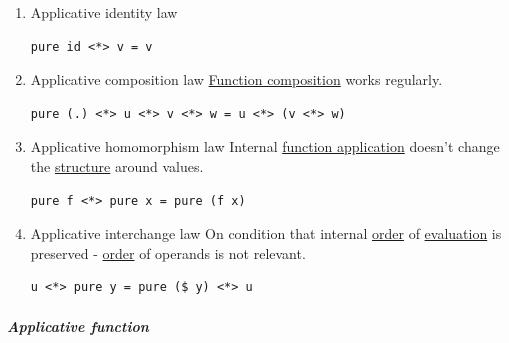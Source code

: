 \documentclass[11pt]{article}
\begin{document}
\begin{enumerate}
\item \label{orgd335983}Applicative identity law
\label{sec:org5c5e2c7}
\begin{verbatim}
pure id <*> v = v
\end{verbatim}

\item \label{org9bb970b}Applicative composition law
\label{sec:orgba0036c}
\hyperref[org3802537]{Function composition} works regularly.\\
\begin{verbatim}
pure (.) <*> u <*> v <*> w = u <*> (v <*> w)
\end{verbatim}

\item \label{orga28c287}Applicative homomorphism law
\label{sec:org22c34c3}
Internal \hyperref[org6aac242]{function application} doesn't change the \hyperref[org8051f61]{structure} around values.\\
\begin{verbatim}
pure f <*> pure x = pure (f x)
\end{verbatim}

\item \label{org15e7bbe}Applicative interchange law
\label{sec:org91d86cf}
On condition that internal \hyperref[orgc0a359b]{order} of \hyperref[orgbb765d1]{evaluation} is preserved - \hyperref[orgc0a359b]{order} of operands is not relevant.\\
\begin{verbatim}
u <*> pure y = pure ($ y) <*> u
\end{verbatim}
\end{enumerate}

\subparagraph{\label{org9997932}Applicative function}
\label{sec:org2f815ea}
\end{document}
